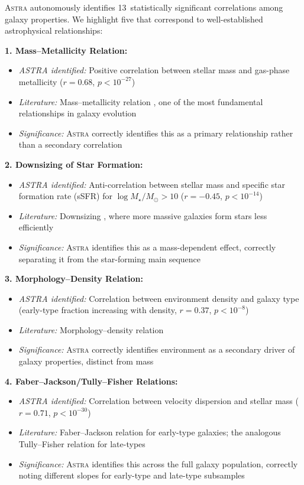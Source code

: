 \documentclass[fleqn,usenatbib]{mnras}
\newcommand{\astra}{\textsc{Astra}\xspace}
\begin{document}
\astra autonomously identifies 13~statistically significant correlations among galaxy properties.
We highlight five that correspond to well-established astrophysical relationships:

\textbf{1. Mass--Metallicity Relation:}
\begin{itemize}
  \item \emph{ASTRA identified:} Positive correlation between stellar mass and gas-phase metallicity ($r = 0.68$, $p < 10^{-27}$)
  \item \emph{Literature:} Mass--metallicity relation \citep{Tremonti2004}, one of the most fundamental relationships in galaxy evolution
  \item \emph{Significance:} \astra correctly identifies this as a primary relationship rather than a secondary correlation
\end{itemize}

\textbf{2. Downsizing of Star Formation:}
\begin{itemize}
  \item \emph{ASTRA identified:} Anti-correlation between stellar mass and specific star formation rate (sSFR) for $\log M_{\star}/M_{\odot} > 10$ ($r = -0.45$, $p < 10^{-14}$)
  \item \emph{Literature:} Downsizing \citep{Brinchmann2004}, where more massive galaxies form stars less efficiently
  \item \emph{Significance:} \astra identifies this as a mass-dependent effect, correctly separating it from the star-forming main sequence
\end{itemize}

\textbf{3. Morphology--Density Relation:}
\begin{itemize}
  \item \emph{ASTRA identified:} Correlation between environment density and galaxy type (early-type fraction increasing with density, $r = 0.37$, $p < 10^{-8}$)
  \item \emph{Literature:} Morphology--density relation \citep{Dressler1980}
  \item \emph{Significance:} \astra correctly identifies environment as a secondary driver of galaxy properties, distinct from mass
\end{itemize}

\textbf{4. Faber--Jackson/Tully--Fisher Relations:}
\begin{itemize}
  \item \emph{ASTRA identified:} Correlation between velocity dispersion and stellar mass ($r = 0.71$, $p < 10^{-30}$)
  \item \emph{Literature:} Faber--Jackson relation for early-type galaxies; the analogous Tully--Fisher relation for late-types
  \item \emph{Significance:} \astra identifies this across the full galaxy population, correctly noting different slopes for early-type and late-type subsamples
\end{itemize}
\end{document}
